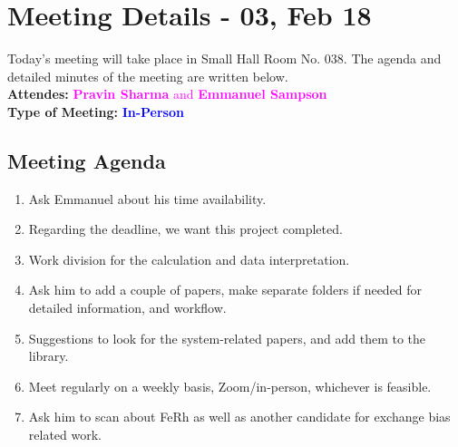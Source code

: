 \section{Meeting Details - 03, Feb 18}
\label{chap:Meeting_03}
Today's meeting will take place in Small Hall Room No. 038. The agenda and detailed minutes of the meeting are written below.
\\ \textbf{Attendes:}
\textcolor{magenta}{\textbf{Pravin Sharma} and \textbf{Emmanuel Sampson}}
\\ \textbf{Type of Meeting:}
\textcolor{blue}{\textbf{In-Person} }
\subsection*{Meeting Agenda}
\begin{enumerate}
    \item Ask Emmanuel about his time availability.
    \item Regarding the deadline, we want this project completed.
    \item Work division for the calculation and data interpretation.
    \item Ask him to add a couple of papers, make separate folders if needed for detailed information, and workflow.
    \item Suggestions to look for the system-related papers, and add them to the library.
    \item Meet regularly on a weekly basis, Zoom/in-person, whichever is feasible.
    \item Ask him to scan about FeRh as well as another candidate for exchange bias related work. \xmark
\end{enumerate}

